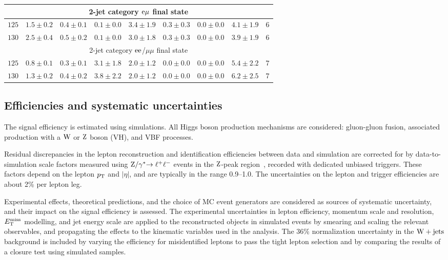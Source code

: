 \documentclass[12pt,twoside,a4paper,cmspaper,final,collab]{cms-tdr}
\begin{document}
\begin{table}[h!t]
\begin{center}
{\begin{tabular} {l|c|c|c|c|c|c|c|c}
\hline
\multicolumn{9}{c}{2-jet category  $\mathrm{e}\mu$ final state} \\
\hline
 $125$ & $1.5\pm0.2$ & $0.4\pm0.1$ & $0.1\pm0.0$ & $3.4\pm1.9$ & $0.3\pm0.3$ & $0.0\pm0.0$ & $4.1\pm1.9$ & $6$ \\
 $130$ & $2.5\pm0.4$ & $0.5\pm0.2$ & $0.1\pm0.0$ & $3.0\pm1.8$ & $0.3\pm0.3$ & $0.0\pm0.0$ & $3.9\pm1.9$ & $6$ \\
\hline
\multicolumn{9}{c}{2-jet category $\mathrm{e}\mathrm{e}$/$\mu\mu$ final state} \\
\hline
 $125$ & $0.8\pm0.1$ & $0.3\pm0.1$ & $3.1\pm1.8$ & $2.0\pm1.2$ & $0.0\pm0.0$ & $0.0\pm0.0$ & $5.4\pm2.2$ & $7$ \\
 $130$ & $1.3\pm0.2$ & $0.4\pm0.2$ & $3.8\pm2.2$ & $2.0\pm1.2$ & $0.0\pm0.0$ & $0.0\pm0.0$ & $6.2\pm2.5$ & $7$ \\
\hline
  \end{tabular}
  }
  \end{center}
\end{table}

\subsection{Efficiencies and systematic uncertainties}
\label{sec:systematics}

The signal efficiency is estimated using simulations.
All Higgs boson production mechanisms are considered:
gluon-gluon fusion, associated production  with
a $\mathrm{W}$ or $\mathrm{Z}$ boson (VH), and VBF processes.

Residual discrepancies in the lepton reconstruction and identification
efficiencies between data and simulation are corrected for by
data-to-simulation scale factors measured using $\mathrm{Z}/\gamma^*{\to \ell^+\ell^-}$ events in the
$\mathrm{Z}$-peak region~\cite{CMS:2011aa}, recorded with dedicated unbiased triggers.
These factors depend on the lepton $p_{\mathrm{T}}$ and $|\eta|$, and
are typically in the range 0.9--1.0. The uncertainties on the lepton and
trigger efficiencies are about 2\% per lepton leg.

Experimental effects, theoretical predictions, and the choice of MC event
generators are considered as sources of systematic uncertainty, and their impact on the signal
efficiency is assessed.
The experimental uncertainties in lepton efficiency, momentum scale and resolution, $E_{\mathrm{T}}^{\text{miss}}$
modelling, and jet energy scale are applied to the reconstructed objects in simulated events by smearing
and scaling the relevant observables, and propagating the effects to the kinematic variables used
in the analysis.
The 36\% normalization uncertainty in the $\mathrm{W}+\text{jets}$ background is included by varying
the efficiency for misidentified leptons to pass the tight lepton
selection and by comparing the results of a closure test using simulated samples.
\end{document}

